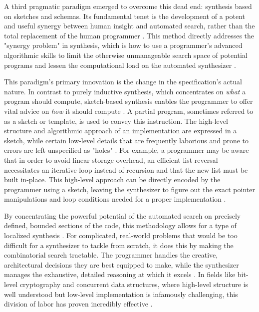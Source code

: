 \documentclass[12pt, a4paper]{report}
\begin{document}
A third pragmatic paradigm emerged to overcome this dead end: synthesis based on sketches and schemas. Its fundamental tenet is the development of a potent and useful synergy between human insight and automated search, rather than the total replacement of the human programmer \citep{solar2008combinatorial}. This method directly addresses the "synergy problem" in synthesis, which is how to use a programmer's advanced algorithmic skills to limit the otherwise unmanageable search space of potential programs and lessen the computational load on the automated synthesizer \citep{solar2008combinatorial}.

This paradigm's primary innovation is the change in the specification's actual nature. In contrast to purely inductive synthesis, which concentrates on \textit{what} a program should compute, sketch-based synthesis enables the programmer to offer vital advice on \textit{how} it should compute \citep{solar2008program}. A partial program, sometimes referred to as a sketch or template, is used to convey this instruction. The high-level structure and algorithmic approach of an implementation are expressed in a sketch, while certain low-level details that are frequently laborious and prone to errors are left unspecified as "holes" \citep{solar2008combinatorial}. For example, a programmer may be aware that in order to avoid linear storage overhead, an efficient list reversal necessitates an iterative loop instead of recursion and that the new list must be built in-place. This high-level approach can be directly encoded by the programmer using a sketch, leaving the synthesizer to figure out the exact pointer manipulations and loop conditions needed for a proper implementation \citep{solar2008program}.

By concentrating the powerful potential of the automated search on precisely defined, bounded sections of the code, this methodology allows for a type of localized synthesis \citep{solar2008program}. For complicated, real-world problems that would be too difficult for a synthesizer to tackle from scratch, it does this by making the combinatorial search tractable. The programmer handles the creative, architectural decisions they are best equipped to make, while the synthesizer manages the exhaustive, detailed reasoning at which it excels \citep{solar2008program}. In fields like bit-level cryptography and concurrent data structures, where high-level structure is well understood but low-level implementation is infamously challenging, this division of labor has proven incredibly effective \citep{solar2008combinatorial}.
\end{document}
